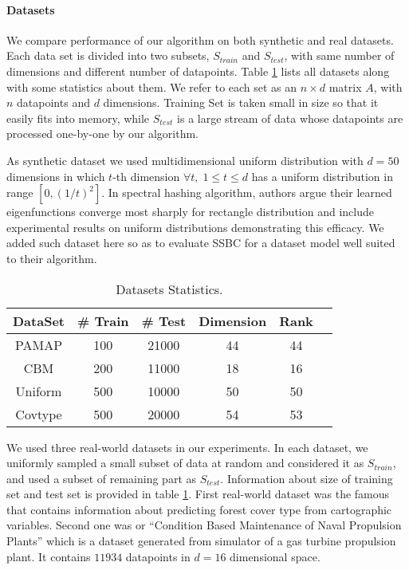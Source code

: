 \documentclass{sig-alternate}
\begin{document}
\paragraph{Datasets}
We compare performance of our algorithm on both synthetic and real datasets.
Each data set is divided into two subsets, $S_{train}$ and $S_{test}$, with same number of dimensions and different number of datapoints. 
Table \ref{tbl:datasets} lists all datasets along with some statistics about them.
We refer to each set as an $n \times d$ matrix $A$, with $n$ datapoints and $d$ dimensions. Training Set is taken small in size so that it easily fits into memory, while $S_{test}$ is a large stream of data whose datapoints are processed one-by-one by our algorithm.    

As synthetic dataset we used multidimensional uniform distribution with $d = 50$ dimensions in which $t$-th dimension $\forall t,\; 1 \leq t \leq d$ has a uniform distribution in range $[0,(1/t)^2]$. In spectral hashing algorithm\cite{weiss2009spectral}, authors argue their learned eigenfunctions converge most sharply for rectangle distribution and include experimental results on uniform distributions demonstrating this efficacy. We added such dataset here so as to evaluate SSBC for a dataset model well suited to their algorithm.

\begin{table}[t!!!!]
\begin{center}
\begin{tabular}{|c||c|c|c|c|c|}
\hline
\textbf{DataSet} & \textbf{\# Train} & \textbf{\# Test} & \textbf{Dimension} & \textbf{Rank} \\
\hline
\hline
\textsf{PAMAP} & 100 & 21000 & 44 & 44 \\
\hline
\textsf{CBM}& 200 & 11000 & 18 & 16  \\  
\hline   
\textsf{Uniform} & 500 & 10000 & 50 & 50 \\
\hline 
\textsf{Covtype} & 500 & 20000 & 54 & 53 \\  
\hline 
\end{tabular} 
\end{center}
\vspace{-2mm}
\caption{\label{tbl:datasets} Datasets Statistics.}
\end{table}

We used three real-world datasets in our experiments. In each dataset, we uniformly sampled a small subset of data at random and considered it as $S_{train}$, and used a subset of remaining part as $S_{test}$. Information about size of training set and test set is provided in table \ref{tbl:datasets}.
First real-world dataset was the famous \cite{Covtype} that contains information about predicting forest cover type from cartographic variables.
Second one was  or ``Condition Based Maintenance of Naval Propulsion Plants''\cite{Coraddu2013Machine} which is a dataset generated from simulator of a gas turbine propulsion plant. It contains $11934$ datapoints in $d = 16$ dimensional space.
\end{document}
